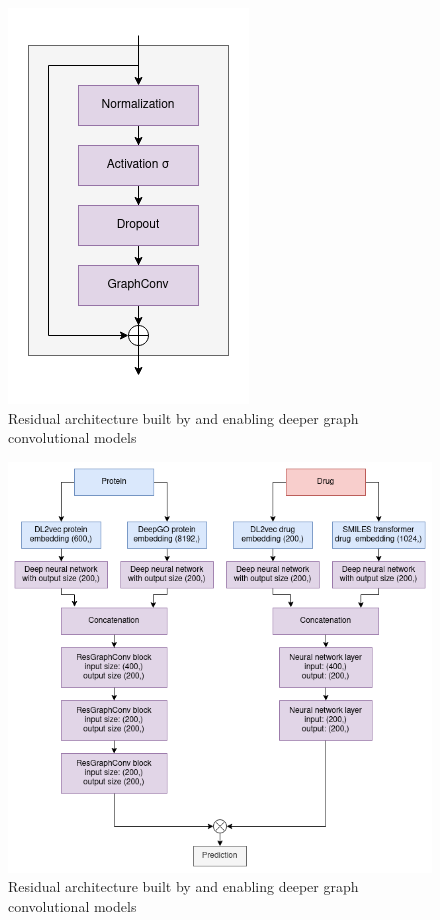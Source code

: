 \documentclass{bioinfo}
\begin{document}
\begin{figure}[!tpb]%
	\centerline{\includegraphics[width=0.5\columnwidth]{figures/ResGraphConvBlocks.png}}
	\caption{Residual architecture built by \citet{DeepGCN2019} and \citet{DeeperGCN2020} enabling deeper graph convolutional models}
	\label{fig:ResGraphConvBlocks}
\end{figure}


\begin{figure}[!tpb]%
	\centerline{\includegraphics[width=1\columnwidth]{figures/full_model_all_layers.png}}
	\caption{Residual architecture built by \citet{DeepGCN2019} and \citet{DeeperGCN2020} enabling deeper graph convolutional models}
	\label{fig:FullModelAllLayers}
\end{figure}
\end{document}
